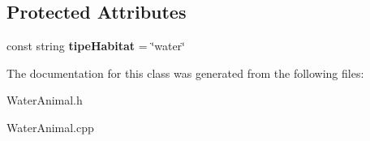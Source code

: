 \subsection*{Protected Attributes}
\begin{DoxyCompactItemize}
\item 
\hypertarget{classWaterAnimal_af8fd1fd731bd336dbe1133d0e950004a}{const string {\bfseries tipe\-Habitat} = \char`\"{}water\char`\"{}}\label{classWaterAnimal_af8fd1fd731bd336dbe1133d0e950004a}

\end{DoxyCompactItemize}


The documentation for this class was generated from the following files\-:\begin{DoxyCompactItemize}
\item 
Water\-Animal.\-h\item 
Water\-Animal.\-cpp\end{DoxyCompactItemize}
